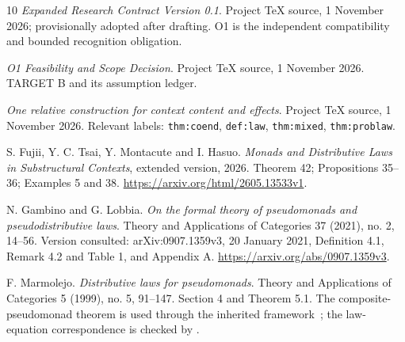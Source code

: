 \documentclass[11pt,a4paper]{article}
\theoremstyle{definition}
\begin{document}
\begin{thebibliography}{10}
\emph{Expanded Research Contract Version 0.1}.
Project TeX source, 1 November 2026; provisionally adopted after drafting.
O1 is the independent compatibility and bounded recognition obligation.

\emph{O1 Feasibility and Scope Decision}.
Project TeX source, 1 November 2026. TARGET B and its assumption ledger.

\emph{One relative construction for context content and effects}.
Project TeX source, 1 November 2026.
Relevant labels: \texttt{thm:coend}, \texttt{def:law},
\texttt{thm:mixed}, \texttt{thm:problaw}.

S. Fujii, Y. C. Tsai, Y. Montacute and I. Hasuo.
\emph{Monads and Distributive Laws in Substructural Contexts}, extended
version, 2026. Theorem 42; Propositions 35--36; Examples 5 and 38.
\url{https://arxiv.org/html/2605.13533v1}.

N. Gambino and G. Lobbia.
\emph{On the formal theory of pseudomonads and pseudodistributive laws}.
Theory and Applications of Categories 37 (2021), no. 2, 14--56.
Version consulted: arXiv:0907.1359v3, 20 January 2021,
Definition 4.1, Remark 4.2 and Table 1, and Appendix A.
\url{https://arxiv.org/abs/0907.1359v3}.

F. Marmolejo.
\emph{Distributive laws for pseudomonads}.
Theory and Applications of Categories 5 (1999), no. 5, 91--147.
Section 4 and Theorem 5.1. The composite-pseudomonad theorem is used through
the inherited framework~\cite{Unified}; the law-equation correspondence is
checked by \cite[Remark 4.2 and Table 1]{GambinoLobbia}.
\end{thebibliography}
\end{document}
